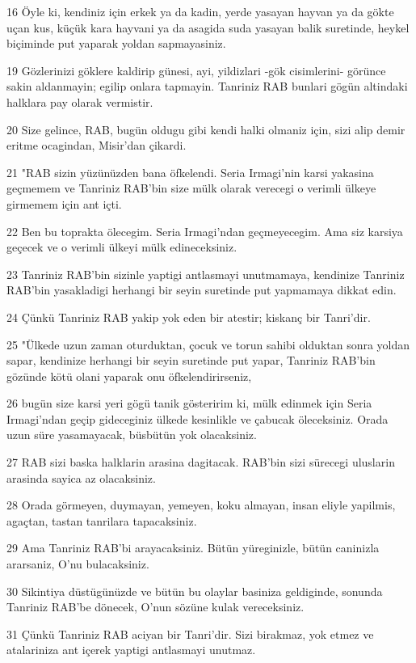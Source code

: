 \par 16 Öyle ki, kendiniz için erkek ya da kadin, yerde yasayan hayvan ya da gökte uçan kus, küçük kara hayvani ya da asagida suda yasayan balik suretinde, heykel biçiminde put yaparak yoldan sapmayasiniz.
\par 19 Gözlerinizi göklere kaldirip günesi, ayi, yildizlari -gök cisimlerini- görünce sakin aldanmayin; egilip onlara tapmayin. Tanriniz RAB bunlari gögün altindaki halklara pay olarak vermistir.
\par 20 Size gelince, RAB, bugün oldugu gibi kendi halki olmaniz için, sizi alip demir eritme ocagindan, Misir'dan çikardi.
\par 21 "RAB sizin yüzünüzden bana öfkelendi. Seria Irmagi'nin karsi yakasina geçmemem ve Tanriniz RAB'bin size mülk olarak verecegi o verimli ülkeye girmemem için ant içti.
\par 22 Ben bu toprakta ölecegim. Seria Irmagi'ndan geçmeyecegim. Ama siz karsiya geçecek ve o verimli ülkeyi mülk edineceksiniz.
\par 23 Tanriniz RAB'bin sizinle yaptigi antlasmayi unutmamaya, kendinize Tanriniz RAB'bin yasakladigi herhangi bir seyin suretinde put yapmamaya dikkat edin.
\par 24 Çünkü Tanriniz RAB yakip yok eden bir atestir; kiskanç bir Tanri'dir.
\par 25 "Ülkede uzun zaman oturduktan, çocuk ve torun sahibi olduktan sonra yoldan sapar, kendinize herhangi bir seyin suretinde put yapar, Tanriniz RAB'bin gözünde kötü olani yaparak onu öfkelendirirseniz,
\par 26 bugün size karsi yeri gögü tanik gösteririm ki, mülk edinmek için Seria Irmagi'ndan geçip gideceginiz ülkede kesinlikle ve çabucak öleceksiniz. Orada uzun süre yasamayacak, büsbütün yok olacaksiniz.
\par 27 RAB sizi baska halklarin arasina dagitacak. RAB'bin sizi sürecegi uluslarin arasinda sayica az olacaksiniz.
\par 28 Orada görmeyen, duymayan, yemeyen, koku almayan, insan eliyle yapilmis, agaçtan, tastan tanrilara tapacaksiniz.
\par 29 Ama Tanriniz RAB'bi arayacaksiniz. Bütün yüreginizle, bütün caninizla ararsaniz, O'nu bulacaksiniz.
\par 30 Sikintiya düstügünüzde ve bütün bu olaylar basiniza geldiginde, sonunda Tanriniz RAB'be dönecek, O'nun sözüne kulak vereceksiniz.
\par 31 Çünkü Tanriniz RAB aciyan bir Tanri'dir. Sizi birakmaz, yok etmez ve atalariniza ant içerek yaptigi antlasmayi unutmaz.
